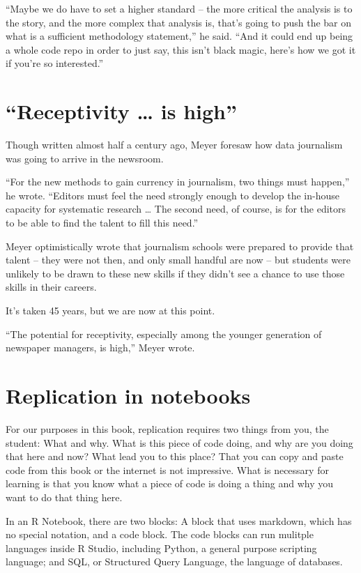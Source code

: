 \documentclass[]{book}
\begin{document}
``Maybe we do have to set a higher standard -- the more critical the analysis is to the story, and the more complex that analysis is, that's going to push the bar on what is a sufficient methodology statement,'' he said. ``And it could end up being a whole code repo in order to just say, this isn't black magic, here's how we got it if you're so interested.''

\hypertarget{receptivity-is-high}{%
\section{``Receptivity \ldots{} is high''}\label{receptivity-is-high}}

Though written almost half a century ago, Meyer foresaw how data journalism was going to arrive in the newsroom.

``For the new methods to gain currency in journalism, two things must happen,'' he wrote. ``Editors must feel the need strongly enough to develop the in-house capacity for systematic research \ldots{} The second need, of course, is for the editors to be able to find the talent to fill this need.''

Meyer optimistically wrote that journalism schools were prepared to provide that talent -- they were not then, and only small handful are now -- but students were unlikely to be drawn to these new skills if they didn't see a chance to use those skills in their careers.

It's taken 45 years, but we are now at this point.

``The potential for receptivity, especially among the younger generation of newspaper managers, is high,'' Meyer wrote.

\hypertarget{replication-in-notebooks}{%
\section{Replication in notebooks}\label{replication-in-notebooks}}

For our purposes in this book, replication requires two things from you, the student: What and why. What is this piece of code doing, and why are you doing that here and now? What lead you to this place? That you can copy and paste code from this book or the internet is not impressive. What is necessary for learning is that you know what a piece of code is doing a thing and why you want to do that thing here.

In an R Notebook, there are two blocks: A block that uses markdown, which has no special notation, and a code block. The code blocks can run mulitple languages inside R Studio, including Python, a general purpose scripting language; and SQL, or Structured Query Language, the language of databases.
\end{document}
